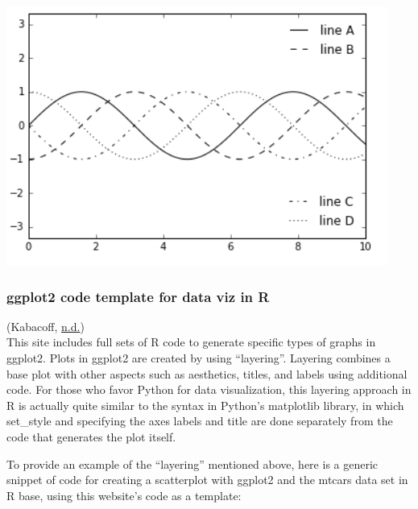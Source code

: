 \documentclass[]{book}
\begin{document}
\includegraphics{images/legend5.png}

\hypertarget{ggplot2-code-template-for-data-viz-in-r}{%
\subsubsection{ggplot2 code template for data viz in R}\label{ggplot2-code-template-for-data-viz-in-r}}

(Kabacoff, \protect\hyperlink{ref-viz_Rggplot}{n.d.})\\
This site includes full sets of R code to generate specific types of graphs in ggplot2. Plots in ggplot2 are created by using ``layering''. Layering combines a base plot with other aspects such as aesthetics, titles, and labels using additional code. For those who favor Python for data visualization, this layering approach in R is actually quite similar to the syntax in Python's matplotlib library, in which set\_style and specifying the axes labels and title are done separately from the code that generates the plot itself.

To provide an example of the ``layering'' mentioned above, here is a generic snippet of code for creating a scatterplot with ggplot2 and the mtcars data set in R base, using this website's code as a template:
\end{document}
